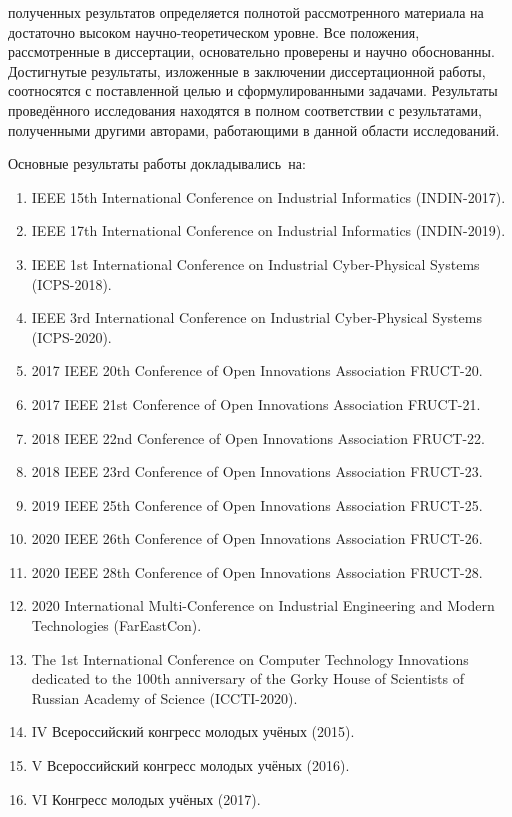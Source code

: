 {\reliability} полученных результатов определяется полнотой рассмотренного материала на достаточно высоком научно-теоретическом уровне. Все положения,  рассмотренные в диссертации, основательно проверены и научно обоснованны. Достигнутые результаты, изложенные в заключении диссертационной работы, соотносятся с поставленной целью и сформулированными задачами. Результаты проведённого исследования находятся в полном соответствии с результатами, полученными другими авторами, работающими в данной области исследований.


{\probation}
Основные результаты работы докладывались~на:
\begin{enumerate}[beginpenalty=10000]
	\item IEEE 15th International Conference on Industrial Informatics (INDIN-2017).
	\item IEEE 17th International Conference on Industrial Informatics (INDIN-2019).
	\item IEEE 1st International Conference on Industrial Cyber-Physical Systems (ICPS-2018).
	\item IEEE 3rd International Conference on Industrial Cyber-Physical Systems (ICPS-2020).
	\item 2017 IEEE 20th Conference of Open Innovations Association {FRUCT-20}.
	\item 2017 IEEE 21st Conference of Open Innovations Association {FRUCT-21}.
	\item 2018 IEEE 22nd Conference of Open Innovations Association {FRUCT-22}.
	\item 2018 IEEE 23rd Conference of Open Innovations Association {FRUCT-23}.
	\item 2019 IEEE 25th Conference of Open Innovations Association {FRUCT-25}.
	\item 2020 IEEE 26th Conference of Open Innovations Association {FRUCT-26}.
	\item 2020 IEEE 28th Conference of Open Innovations Association {FRUCT-28}.
	\item 2020 International Multi-Conference on Industrial Engineering and Modern Technologies (FarEastCon).
	\item The 1st International Conference on Computer Technology Innovations dedicated to the 100th anniversary of the Gorky House of Scientists of Russian Academy of Science (ICCTI-2020).
	\item IV Всероссийский конгресс молодых учёных (2015).
	\item V Всероссийский конгресс молодых учёных (2016).
	\item VI Конгресс молодых учёных (2017).

\end{enumerate}
